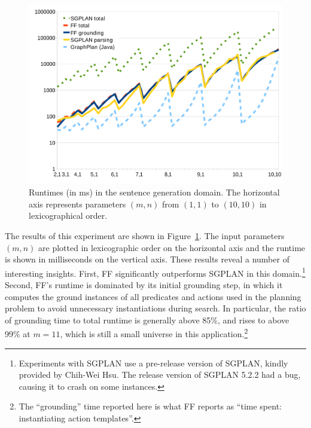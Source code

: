 \begin{figure}
  \centering
  \includegraphics[width=1\columnwidth]{graph-exp1}
  \caption{Runtimes (in ms) in the sentence generation domain.  The
    horizontal axis represents parameters $(m,n)$ from $(1,1)$ to
    $(10,10)$ in lexicographical order.}
  \label{fig:runtimes-crisp}
\end{figure}

The results of this experiment are shown in
Figure~\ref{fig:runtimes-crisp}. The input parameters $(m,n)$ are plotted
in lexicographic order on the horizontal axis and the runtime is shown in
milliseconds on the vertical axis. These results reveal a number of
interesting insights. First, FF significantly outperforms
SGPLAN in this domain.\footnote{Experiments with SGPLAN use a
 pre-release version of SGPLAN, kindly provided by Chih-Wei Hsu. The
 release version of SGPLAN 5.2.2 had a bug, causing it to crash on some
 instances.}
Second, FF's runtime is dominated by its initial grounding step, in which
it computes the ground instances of all predicates and actions used in the
planning problem to avoid unnecessary instantiations during search. In
particular, the ratio of grounding time to total runtime is generally above
85\%, and rises to above 99\% at $m=11$, which is still a small universe in
this application.\footnote{The
  ``grounding'' time reported here is what FF reports as ``time spent:
  instantiating action templates''.} 

